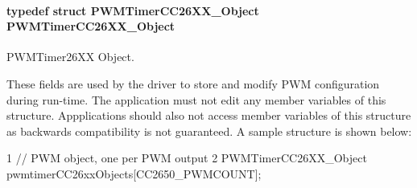 \paragraph[{P\+W\+M\+Timer\+C\+C26\+X\+X\+\_\+\+Object}]{\setlength{\rightskip}{0pt plus 5cm}typedef struct {\bf P\+W\+M\+Timer\+C\+C26\+X\+X\+\_\+\+Object}  {\bf P\+W\+M\+Timer\+C\+C26\+X\+X\+\_\+\+Object}}\label{_p_w_m_timer_c_c26_x_x_8h_a655ae995c6140ecdc5e97abf2f89c8ab}


P\+W\+M\+Timer26\+X\+X Object. 

These fields are used by the driver to store and modify P\+W\+M configuration during run-\/time. The application must not edit any member variables of this structure. Appplications should also not access member variables of this structure as backwards compatibility is not guaranteed. A sample structure is shown below\+: 
\begin{DoxyCode}
1 // PWM object, one per PWM output
2 PWMTimerCC26XX\_Object pwmtimerCC26xxObjects[CC2650\_PWMCOUNT];
\end{DoxyCode}
 